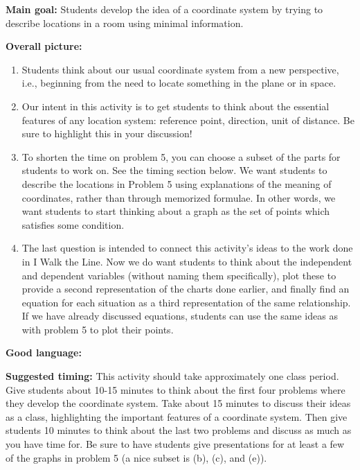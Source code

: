 \documentclass[nooutcomes,noauthor,handout] {ximera}
\begin{document}
\pagebreak

\begin{instructorNotes}

{\bf Main goal:} Students develop the idea of a coordinate system by trying to describe locations in a room using minimal information.


{\bf Overall picture:}


\begin{enumerate}
\item Students think about our usual coordinate system from a new perspective, i.e., beginning from the need to locate something in the plane or in space.
\item  Our intent in this activity is to get students to think about the essential features of any location system: reference point, direction, unit of distance. Be sure to highlight this in your discussion!
\item To shorten the time on problem 5, you can choose a subset of the parts for students to work on. See the timing section below. We want students to describe the locations in Problem 5 using explanations of the meaning of coordinates, rather than through memorized formulae. In other words, we want students to start thinking about a graph as the set of points which satisfies some condition.
\item  The last question is intended to connect this activity's ideas to the work done in I Walk the Line.  Now we do want students to think about the independent and dependent variables (without naming them specifically), plot these to provide a second representation of the charts done earlier, and finally find an equation for each situation as a third representation of the same relationship. If we have already discussed equations, students can use the same ideas as with problem 5 to plot their points.
\end{enumerate}





{\bf Good language:}


{\bf Suggested timing:} This activity should take approximately one class period. Give students about 10-15 minutes to think about the first four problems where they develop the coordinate system. Take about 15 minutes to discuss their ideas as a class, highlighting the important features of a coordinate system. Then give students 10 minutes to think about the last two problems and discuss as much as you have time for. Be sure to have students give presentations for at least a few of the graphs in problem 5 (a nice subset is (b), (c), and (e)).

\end{instructorNotes}
\end{document}

